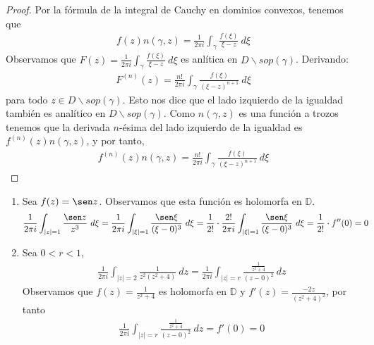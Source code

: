 \begin{proof}
    Por la fórmula de la integral de Cauchy en dominios convexos, tenemos que
    \begin{align*}
        f(z)n(\gamma,z) = \frac{1}{2\pi i} \int_{\gamma} \frac{f(\xi)}{\xi - z} \ d\xi
    \end{align*}
    Observamos que $F(z) = \frac{1}{2\pi i} \int_{\gamma} \frac{f(\xi)}{\xi - z} \ d\xi$ es anlítica en $D \backslash sop(\gamma)$. Derivando:
    \begin{align*}
        F^{(n)}(z) = \frac{n!}{2\pi i} \int_{\gamma} \frac{f(\xi)}{(\xi - z)^{n+1}} \ d\xi
    \end{align*}
    para todo $z \in D \backslash sop(\gamma)$. Esto nos dice que el lado izquierdo de la igualdad también es analítico en $D \backslash sop(\gamma)$. Como $n(\gamma,z)$ es una función a trozos tenemos que la derivada $n$-ésima del lado izquierdo de la igualdad es $f^{(n)}(z)n(\gamma,z)$, y
    por tanto,
    \begin{align*}
        f^{(n)}(z)n(\gamma,z) = \frac{n!}{2\pi i} \int_{\gamma} \frac{f(\xi)}{(\xi - z)^{n+1}} \ d\xi
    \end{align*}
\end{proof}

\begin{ejemplo}
    \begin{enumerate}
        \item Sea $f(z) = \sen z$. Observamos que esta función es holomorfa en $\mathbb{D}$.
              \begin{align*}
                  \frac{1}{2\pi i} \int_{|z| = 1} \frac{\sen z}{z^3} \ d\xi & = \frac{1}{2\pi i}\int_{|\xi| = 1} \frac{\sen \xi}{(\xi - 0)^3} \ d\xi = \frac{1}{2!} \cdot \frac{2!}{2\pi i}\int_{|\xi| = 1} \frac{\sen \xi}{(\xi - 0)^3} \ d\xi =  \frac{1}{2!} \cdot f''(0) = 0
              \end{align*}
        \item Sea $0 < r < 1$,
              \begin{align*}
                  \frac{1}{2\pi i}\int_{|z| = 2} \frac{1}{z^2(z^2 + 4)} \ dz = \frac{1}{2\pi i}\int_{|z| = r} \frac{\frac{1}{z^2+4}}{(z-0)^2} \ dz
              \end{align*}
              Observamos que $f(z) = \frac{1}{z^2 + 4}$ es holomorfa en $\mathbb{D}$ y $f'(z) = \frac{-2z}{(z^2+4)^2}$, por tanto
              \begin{align*}
                  \frac{1}{2\pi i}\int_{|z| = r} \frac{\frac{1}{z^2+4}}{(z-0)^2} \ dz = f'(0) = 0
              \end{align*}
    \end{enumerate}
\end{ejemplo}

